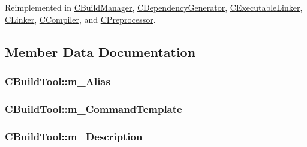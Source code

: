Reimplemented in \hyperlink{classCBuildManager_a62bfb161da5eacc3b372c220dc89fa0b}{C\-Build\-Manager}, \hyperlink{classCDependencyGenerator_a631a53bd18d1974f7375a665e17357a2}{C\-Dependency\-Generator}, \hyperlink{classCExecutableLinker_a6124deba72724510423c17963f960578}{C\-Executable\-Linker}, \hyperlink{classCLinker_ad2b70ef5f824d2697b4f12579415dca3}{C\-Linker}, \hyperlink{classCCompiler_a25f64fb47c532b5261c44aca09b34cfa}{C\-Compiler}, and \hyperlink{classCPreprocessor_abe0fdbf2737d9acb4472ad0b40026938}{C\-Preprocessor}.



\subsection{Member Data Documentation}
\hypertarget{classCBuildTool_a494ffa896b4101e77dda5f53954e0b71}{
\subsubsection[{m\-\_\-\-Alias}]{ C\-Build\-Tool\-::m\-\_\-\-Alias\hspace{0.3cm}{\ttfamily [protected]}}}\label{classCBuildTool_a494ffa896b4101e77dda5f53954e0b71}
\hypertarget{classCBuildTool_a2fa8d54915b30ee28de67d4928760967}{
\subsubsection[{m\-\_\-\-Command\-Template}]{ C\-Build\-Tool\-::m\-\_\-\-Command\-Template\hspace{0.3cm}{\ttfamily [protected]}}}\label{classCBuildTool_a2fa8d54915b30ee28de67d4928760967}
\hypertarget{classCBuildTool_a366fc905a28c6b5d06f86830963fc2b7}{
\subsubsection[{m\-\_\-\-Description}]{ C\-Build\-Tool\-::m\-\_\-\-Description\hspace{0.3cm}{\ttfamily [protected]}}}\label{classCBuildTool_a366fc905a28c6b5d06f86830963fc2b7}
